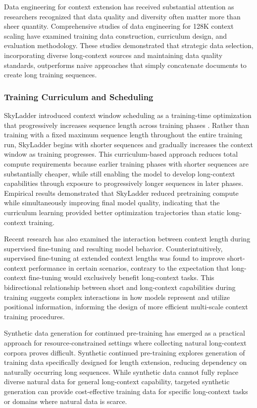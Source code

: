 \documentclass[11pt,letterpaper]{article}
\begin{document}
Data engineering for context extension has received substantial attention as researchers recognized that data quality and diversity often matter more than sheer quantity. Comprehensive studies of data engineering for 128K context scaling have examined training data construction, curriculum design, and evaluation methodology. These studies demonstrated that strategic data selection, incorporating diverse long-context sources and maintaining data quality standards, outperforms naive approaches that simply concatenate documents to create long training sequences.

\subsubsection{Training Curriculum and Scheduling}

SkyLadder introduced context window scheduling as a training-time optimization that progressively increases sequence length across training phases \cite{li2025skyladder}. Rather than training with a fixed maximum sequence length throughout the entire training run, SkyLadder begins with shorter sequences and gradually increases the context window as training progresses. This curriculum-based approach reduces total compute requirements because earlier training phases with shorter sequences are substantially cheaper, while still enabling the model to develop long-context capabilities through exposure to progressively longer sequences in later phases. Empirical results demonstrated that SkyLadder reduced pretraining compute while simultaneously improving final model quality, indicating that the curriculum learning provided better optimization trajectories than static long-context training.

Recent research has also examined the interaction between context length during supervised fine-tuning and resulting model behavior. Counterintuitively, supervised fine-tuning at extended context lengths was found to improve short-context performance in certain scenarios, contrary to the expectation that long-context fine-tuning would exclusively benefit long-context tasks. This bidirectional relationship between short and long-context capabilities during training suggests complex interactions in how models represent and utilize positional information, informing the design of more efficient multi-scale context training procedures.

Synthetic data generation for continued pre-training has emerged as a practical approach for resource-constrained settings where collecting natural long-context corpora proves difficult. Synthetic continued pre-training explores generation of training data specifically designed for length extension, reducing dependency on naturally occurring long sequences. While synthetic data cannot fully replace diverse natural data for general long-context capability, targeted synthetic generation can provide cost-effective training data for specific long-context tasks or domains where natural data is scarce.
\end{document}
